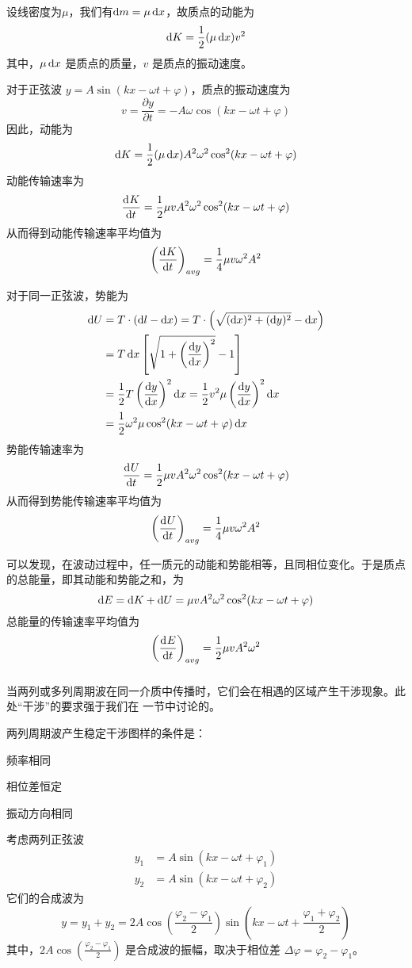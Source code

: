 设线密度为\(\mu\)，我们有\(\dif m=\mu \dif x\)，故质点的动能为
\[
    \dif K = \frac{1}{2} (\mu \dif x) v^2
\]
其中，$\mu \dif x$ 是质点的质量，$v$ 是质点的振动速度。

对于正弦波 $y = A \sin(kx - \omega t + \varphi)$，质点的振动速度为
\[
    v = \frac{\partial y}{\partial t} = -A \omega \cos(kx - \omega t + \varphi)
\]
因此，动能为
\[
    \dif K = \frac{1}{2} (\mu \dif x) A^2 \omega^2 \cos^2(kx - \omega t + \varphi)
\]
动能传输速率为
\[
    \D[]{K}{t} = \frac{1}{2} \mu v A^2 \omega^2 \cos^2(kx - \omega t + \varphi)
\]
从而得到动能传输速率平均值为
\[
    \left( \D[]{K}{t} \right)_{avg} = \frac{1}{4} \mu v \omega^2 A^2
\]

对于同一正弦波，势能为
\[
    \begin{aligned}
        \dif U & = T\cdot(\dif l -\dif x)
        =T\cdot\left(\sqrt{(\dif x)^2+(\dif y)^2} -\dif x\right)                      \\
               & =T\dif x\left[\sqrt{1+\left(\frac{\dif y}{\dif x}\right)^2}-1\right] \\
               & =\frac{1}{2}T\left(\frac{\dif y}{\dif x}\right)^2\dif x
        =\frac{1}{2}v^2 \mu \left(\frac{\dif y}{\dif x}\right)^2\dif x                \\
               & =\frac{1}{2}\omega^2 \mu \cos^2(kx - \omega t + \varphi)\dif x
    \end{aligned}
\]
势能传输速率为
\[
    \D[]{U}{t} = \frac{1}{2} \mu v A^2 \omega^2 \cos^2(kx - \omega t + \varphi)
\]
从而得到势能传输速率平均值为
\[
    \left( \D[]{U}{t} \right)_{avg} = \frac{1}{4} \mu v \omega^2 A^2
\]

可以发现，在波动过程中，任一质元的动能和势能相等，且同相位变化。于是质点的总能量，即其动能和势能之和，为
\[
    \dif E = \dif K + \dif U = \mu v A^2 \omega^2 \cos^2(kx - \omega t + \varphi)
\]
总能量的传输速率平均值为
\[
    \left( \D[]{E}{t} \right)_{avg} = \frac{1}{2} \mu v A^2 \omega^2
\]
\subsubsection[波的干涉]{}
当两列或多列周期波在同一介质中传播时，它们会在相遇的区域产生干涉现象。此处“干涉”的要求强于我们在  一节中讨论的。

两列周期波产生稳定干涉图样的条件是：
\begin{Itemize}
    \item 频率相同
    \item 相位差恒定
    \item 振动方向相同
\end{Itemize}
考虑两列正弦波
\[
    \begin{aligned}
        y_1 & = A \sin(kx - \omega t + \varphi_1) \\
        y_2 & = A \sin(kx - \omega t + \varphi_2)
    \end{aligned}
\]
它们的合成波为
\[
    y = y_1 + y_2 = 2A \cos\left(\frac{\varphi_2 - \varphi_1}{2}\right) \sin\left(kx - \omega t + \frac{\varphi_1 + \varphi_2}{2}\right)
\]
其中，$2A \cos\left(\frac{\varphi_2 - \varphi_1}{2}\right)$ 是合成波的振幅，取决于相位差 $\Delta \varphi = \varphi_2 - \varphi_1$。


